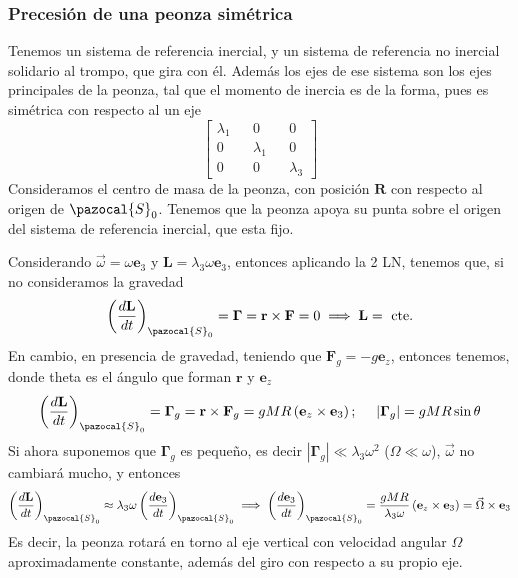 \subsubsection{Precesión de una peonza simétrica}
Tenemos un sistema de referencia inercial, y un sistema de referencia no inercial solidario al trompo, que gira con él. Además los ejes de ese sistema son los ejes principales de la peonza, tal que el momento de inercia es de la forma, pues es simétrica con respecto al un eje
\begin{equation} \label{6.1.1}
    \left[\begin{matrix}
        \lambda_1 && 0 && 0 \\
        0 && \lambda_1 && 0 \\
        0 && 0 && \lambda_3 
    \end{matrix}\right]
\end{equation}
Consideramos el centro de masa de la peonza, con posición $\mathbf{R}$ con respecto al origen de $\pazocal{S}_0$.
Tenemos que la peonza apoya su punta sobre el origen del sistema de referencia inercial, que esta fijo.

Considerando $\vec{\omega} = \omega \mathbf{e}_3$ y $\mathbf{L} = \lambda_3 \omega \mathbf{e}_3$, entonces aplicando la 2 LN, tenemos que, si no consideramos la gravedad
\begin{equation} \label{6.1.1}
    \left(\frac{d\mathbf{L}}{dt}\right)_{\pazocal{S}_0} = \mathbf{\Gamma} = \mathbf{r} \times \mathbf{F} = 0 \implies \mathbf{L} = \mbox{ cte.}
\end{equation}
En cambio, en presencia de gravedad, teniendo que $\mathbf{F}_g = -g \mathbf{e}_z$, entonces tenemos, donde theta es el ángulo que forman $\mathbf{r}$ y $\mathbf{e}_z$
\begin{equation} \label{6.1.1}
    \left(\frac{d\mathbf{L}}{dt}\right)_{\pazocal{S}_0} = \mathbf{\Gamma}_g = \mathbf{r} \times \mathbf{F}_g = gMR \left(\mathbf{e}_z \times \mathbf{e}_3\right); \ \ \ \ |\mathbf{\Gamma}_g| =  gMR \sin\theta 
\end{equation}
Si ahora suponemos que $\mathbf{\Gamma}_g$ es pequeño, es decir $|\mathbf{\Gamma}_g| \ll \lambda_3 \omega^2$ ($\Omega \ll \omega$), $\vec{\omega}$ no cambiará mucho, y entonces 
\begin{equation} \label{6.1.1}
    \left(\frac{d\mathbf{L}}{dt}\right)_{\pazocal{S}_0} \approx \lambda_3 \omega \left(\frac{d\mathbf{e}_3}{dt}\right)_{\pazocal{S}_0} \implies \left(\frac{d\mathbf{e}_3}{dt}\right)_{\pazocal{S}_0} = \frac{gMR}{\lambda_3 \omega} \left(\mathbf{e}_z \times \mathbf{e}_3\right) = \vec{\Omega} \times \mathbf{e}_3
\end{equation}
Es decir, la peonza rotará en torno al eje vertical con velocidad angular $\Omega$ aproximadamente constante, además del giro con respecto a su propio eje.
